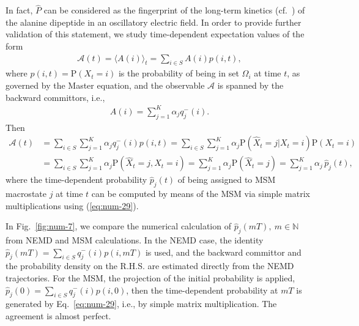 \documentclass[journal=jctcce,manuscript=article]{achemso}
\newcommand{\recheck}[1]{{\color{red} #1}}
\newcommand{\bwd}[0]{-}
\newcommand{\prob}{\textrm{P}}
\begin{document}
In fact, $\hat{P}$ can be considered as the fingerprint of the long-term kinetics (cf.~\cite{A19-39,PrinzKellerNoe_PCCP11_Perspective}) of the alanine dipeptide in an oscillatory electric field.
In order to provide further validation of this statement, we study  time-dependent expectation values of
the form
\begin{align}
  \mathcal A(t) = \langle A(i)\rangle_t = \sum_{i\in S} A(i) p(i,t),
\end{align}
where $p(i,t)=\prob(X_t=i)$ is the probability of being in set $\Omega_i$ at time $t$, as governed by the Master equation, and the observable $\mathcal A$ is  spanned by the backward
committors, i.e.,
\begin{align}\label{A}
  A(i) = \sum_{j=1}^K \alpha_j q^\bwd_j(i).
\end{align}
Then
\begin{align}\nonumber
  \mathcal A(t) &=
  \sum_{i\in S} \sum_{j=1}^K \alpha_j q^\bwd_j(i)  p(i,t)=\sum_{i\in S} \sum_{j=1}^K \alpha_j \prob (\hat X_t = j \vert X_t = i) \prob (X_t = i) \\
  & =
  \sum_{i\in S} \sum_{j=1}^K \alpha_j \prob (\hat X_t = j ,X_t = i)  =
  \sum_{j=1}^K \alpha_j \prob (\hat X_t = j) 
 =
   \sum_{j=1}^K \alpha_j \,\hat p_j (t), \label{eq:num-28}
\end{align}
where the time-dependent probability $\hat{p}_j(t)$ of being assigned to MSM macrostate $j$ at time $t$ can be computed  by means of the MSM via simple matrix multiplications using (\ref{eq:num-29}).

In Fig.~\ref{fig:num-7}, we compare the numerical calculation of $\hat p_j (mT), \ m\in\mathbb N$ from NEMD and MSM calculations.
In the NEMD case, the identity  $\hat p_j (mT) = \sum_{i\in S}  q^\bwd_j(i)  p(i,mT) $ is used, and
the backward committor and the probability density on the R.H.S.
are estimated directly from the
NEMD trajectories. For the MSM, the projection of the initial probability is applied, $\hat p_j (0) = \sum_{i\in S}  q^\bwd_j(i)  p(i,0) $, then
the time-dependent probability at $mT$ is generated by Eq.~\eqref{eq:num-29}, i.e., by simple matrix multiplication. The agreement is almost perfect.

\end{document}
